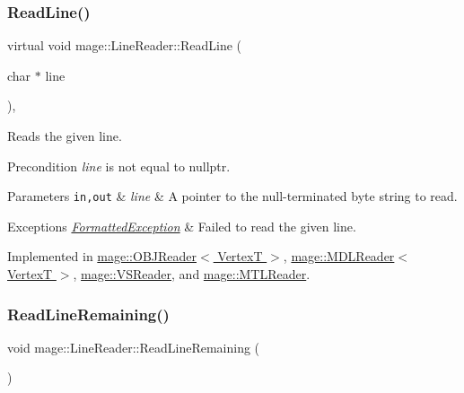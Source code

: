 \subsubsection{\texorpdfstring{Read\+Line()}{ReadLine()}}
{\footnotesize\ttfamily virtual void mage\+::\+Line\+Reader\+::\+Read\+Line (\begin{DoxyParamCaption}\item[{char $\ast$}]{line }\end{DoxyParamCaption})\hspace{0.3cm}{\ttfamily [private]}, {}}

Reads the given line.

\begin{DoxyPrecond}{Precondition}
{\itshape line} is not equal to {\ttfamily nullptr}. 
\end{DoxyPrecond}

\begin{DoxyParams}[1]{Parameters}
\mbox{\tt in,out}  & {\em line} & A pointer to the null-\/terminated byte string to read. \\
\hline
\end{DoxyParams}

\begin{DoxyExceptions}{Exceptions}
{\em \hyperlink{structmage_1_1_formatted_exception}{Formatted\+Exception}} & Failed to read the given line. \\
\hline
\end{DoxyExceptions}


Implemented in \hyperlink{classmage_1_1_o_b_j_reader_a8d4bd7be6de3098ba899cc36e3be1283}{mage\+::\+O\+B\+J\+Reader$<$ Vertex\+T $>$}, \hyperlink{classmage_1_1_m_d_l_reader_ac50f9cce64621b0a218b6778a611a702}{mage\+::\+M\+D\+L\+Reader$<$ Vertex\+T $>$}, \hyperlink{classmage_1_1_v_s_reader_a3a3ba09b410e2144ed082db5f1da3113}{mage\+::\+V\+S\+Reader}, and \hyperlink{classmage_1_1_m_t_l_reader_ac3981549364be195f96b32cfafc8b147}{mage\+::\+M\+T\+L\+Reader}.

\hypertarget{classmage_1_1_line_reader_a3a4b99bfef1e8a826d74a01bcc663fcb}{}\label{classmage_1_1_line_reader_a3a4b99bfef1e8a826d74a01bcc663fcb} 
\subsubsection{\texorpdfstring{Read\+Line\+Remaining()}{ReadLineRemaining()}}
{\footnotesize\ttfamily void mage\+::\+Line\+Reader\+::\+Read\+Line\+Remaining (\begin{DoxyParamCaption}{ }\end{DoxyParamCaption})\hspace{0.3cm}{\ttfamily [protected]}}

